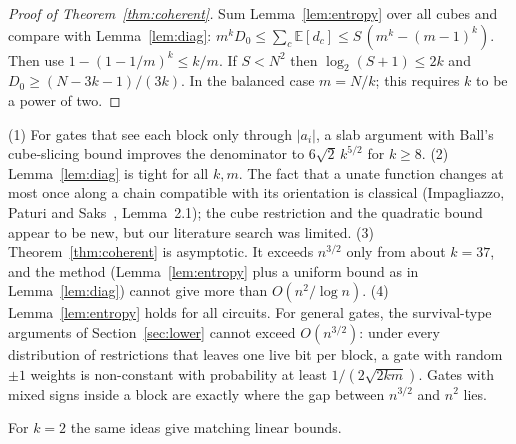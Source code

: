 \begin{proof}[Proof of Theorem~\ref{thm:coherent}]
Sum Lemma~\ref{lem:entropy} over all cubes and compare with
Lemma~\ref{lem:diag}: $m^kD_0\le\sum_c\mathbb E[d_c]\le S\,(m^k-(m-1)^k)$.
Then use $1-(1-1/m)^k\le k/m$. If $S<N^2$ then $\log_2(S+1)\le2k$ and
$D_0\ge(N-3k-1)/(3k)$. In the balanced case $m=N/k$; this requires $k$ to be
a power of two.
\end{proof}

\begin{remark}
(1) For gates that see each block only through $|a_i|$, a slab argument with
Ball's cube-slicing bound improves the denominator to $6\sqrt2\,k^{5/2}$ for
$k\ge8$. (2) Lemma~\ref{lem:diag} is tight for all $k,m$. The fact that a
unate function changes at most once along a chain compatible with its
orientation is classical (Impagliazzo, Paturi and Saks~\cite{IPS},
Lemma~2.1); the cube restriction and the quadratic bound appear to be new,
but our literature search was limited. (3) Theorem~\ref{thm:coherent} is
asymptotic. It exceeds $n^{3/2}$ only from about $k=37$, and the method
(Lemma~\ref{lem:entropy} plus a uniform bound as in Lemma~\ref{lem:diag})
cannot give more than $O(n^2/\log n)$. (4) Lemma~\ref{lem:entropy} holds for
all circuits. For general gates, the survival-type arguments of
Section~\ref{sec:lower} cannot exceed $O(n^{3/2})$: under every
distribution of restrictions that leaves one live bit per block, a gate with
random $\pm1$ weights is non-constant with probability at least
$1/(2\sqrt{2km})$. Gates with mixed signs inside a block are exactly where
the gap between $n^{3/2}$ and $n^2$ lies.
\end{remark}

For $k=2$ the same ideas give matching linear bounds.

